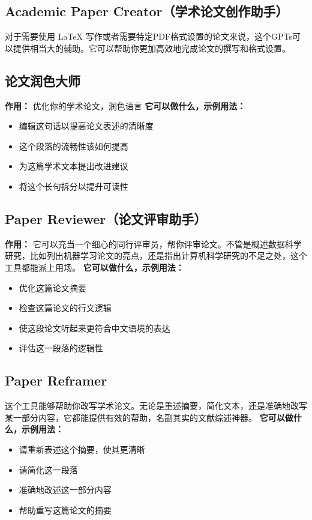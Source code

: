 \begin{itemize}
{\subsection{Academic Paper Creator（学术论文创作助手）}
对于需要使用 LaTeX 写作或者需要特定PDF格式设置的论文来说，这个GPTs可以提供相当大的辅助。它可以帮助你更加高效地完成论文的撰写和格式设置。
\prompt{}

\subsection{论文润色大师}
\textbf{作用：} 优化你的学术论文，润色语言
\textbf{它可以做什么，示例用法：}
\begin{itemize}
    \item 编辑这句话以提高论文表述的清晰度
    \item 这个段落的流畅性该如何提高
    \item 为这篇学术文本提出改进建议
    \item 将这个长句拆分以提升可读性
\end{itemize}
\prompt{}

\subsection{Paper Reviewer（论文评审助手）}
\textbf{作用：} 它可以充当一个细心的同行评审员，帮你评审论文。不管是概述数据科学研究，比如列出机器学习论文的亮点，还是指出计算机科学研究的不足之处，这个工具都能派上用场。
\textbf{它可以做什么，示例用法：}
\begin{itemize}
    \item 优化这篇论文摘要
    \item 检查这篇论文的行文逻辑
    \item 使这段论文听起来更符合中文语境的表达
    \item 评估这一段落的逻辑性
\end{itemize}
\prompt{}

\subsection{Paper Reframer}
这个工具能够帮助你改写学术论文。无论是重述摘要，简化文本，还是准确地改写某一部分内容，它都能提供有效的帮助，名副其实的文献综述神器。
\textbf{它可以做什么，示例用法：}
\begin{itemize}
    \item 请重新表述这个摘要，使其更清晰
    \item 请简化这一段落
    \item 准确地改述这一部分内容
    \item 帮助重写这篇论文的摘要
\end{itemize}
\prompt{}

}
\end{itemize}
